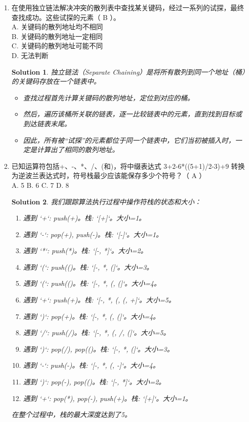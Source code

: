 \documentclass[UTF8]{report}
\newtheorem{solution}{Solution}
\theoremstyle{MyLineTheoremStyle} %
\theoremstyle{MyBlockTheoremStyle} %
\theoremstyle{MySubsubsectionStyle} %
\begin{document}
\begin{enumerate}
    \item 在使用独立链法解决冲突的散列表中查找某关键码，经过一系列的试探，最终查找成功。这些试探的元素（ B ）。\\
    A. 关键码的散列地址均不相同 \\
    B. 关键码的散列地址一定相同 \\
    C. 关键码的散列地址可能不同 \\
    D. 无法判断
    \begin{solution}
        独立链法（Separate Chaining）是将所有散列到同一个地址（桶）的关键码存放在一个链表中。
        \begin{itemize}
            \item 查找过程首先计算关键码的散列地址，定位到对应的桶。
            \item 然后，遍历该桶所关联的链表，逐一比较链表中的元素，直到找到目标或到达链表末尾。
            \item 因此，所有被“试探”的元素都位于同一个链表中，它们当初被插入时，一定是计算出了相同的散列地址。
        \end{itemize}
    \end{solution}

    \item 已知运算符包括+、-、*、/、(和)，将中缀表达式 3+2-6*((5+1)/2-3)+9 转换为逆波兰表达式时，符号栈最少应该能保存多少个符号？（ A ）\\
    A. 5 \quad B. 6 \quad C. 7 \quad D. 8
    \begin{solution}
        我们跟踪算法执行过程中操作符栈的状态和大小：
        \begin{enumerate}
            \item 遇到 `+`: push(+)。栈: `[+]`。大小=1。
            \item 遇到 `-`: pop(+), push(-)。栈: `[-]`。大小=1。
            \item 遇到 `*`: push(*)。栈: `[-, *]`。大小=2。
            \item 遇到 `(`: push(()。栈: `[-, *, (]`。大小=3。
            \item 遇到 `(`: push(()。栈: `[-, *, (, (]`。大小=4。
            \item 遇到 `+`: push(+)。栈: `[-, *, (, (, +]`。大小=5。
            \item 遇到 `)`: pop(+)。栈: `[-, *, (, (]`。大小=4。
            \item 遇到 `/`: push(/)。栈: `[-, *, (, /, (]`。大小=5。
            \item 遇到 `)`: pop(/), pop(()。栈: `[-, *, (]`。大小=3。
            \item 遇到 `-`: push(-)。栈: `[-, *, (, -]`。大小=4。
            \item 遇到 `)`: pop(-), pop(()。栈: `[-, *]`。大小=2。
            \item 遇到 `+`: pop(*), pop(-), push(+)。栈: `[+]`。大小=1。
        \end{enumerate}
        在整个过程中，栈的最大深度达到了5。
    \end{solution}


\end{enumerate}
\end{document}

